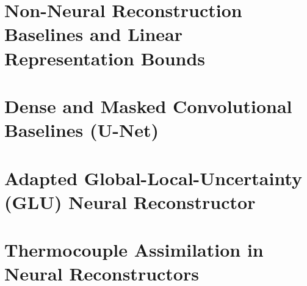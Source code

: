 
\section{Non-Neural Reconstruction Baselines and Linear Representation Bounds}
\label{sec:meth_baselines}

\section{Dense and Masked Convolutional Baselines (U-Net)}
\label{sec:meth_unet}

\section{Adapted Global-Local-Uncertainty (GLU) Neural Reconstructor}
\label{sec:meth_glu}

\section{Thermocouple Assimilation in Neural Reconstructors}
\label{sec:meth_assimilation}

